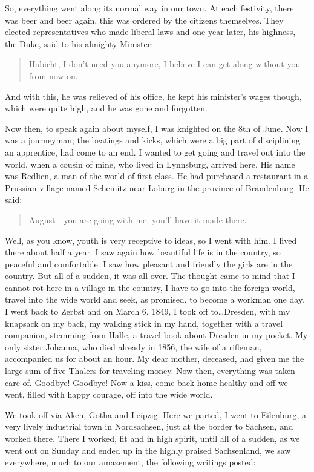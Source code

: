\documentclass{article}
\begin{document}
So, everything went along its normal way in our town. At each festivity, there was beer and beer again, this was ordered by the citizens themselves. They elected representatives who made liberal laws and one year later, his highness, the Duke, said to his almighty Minister:

\begin{quote}
Habicht, I don't need you anymore, I believe I can get along without you from now on.
\end{quote}

And with this, he was relieved of his office, he kept his minister's wages though, which were quite high, and he was gone and forgotten.

Now then, to speak again about myself, I was knighted on the 8th of June. Now I was a journeyman; the beatings and kicks, which were a big part of disciplining an apprentice, had come to an end. I wanted to get going and travel out into the world, when a cousin of mine, who lived in Lynnsburg, arrived here. His name was Redlicn, a man of the world of first class. He had purchased a restaurant in a Prussian village named Scheinitz near Loburg in the province of Brandenburg. He said:

\begin{quote}
August - you are going with me, you'll have it made there.
\end{quote}

Well, as you know, youth is very receptive to ideas, so I went with him. I lived there about half a year. I saw again how beautiful life is in the country, so peaceful and comfortable. I saw how pleasant and friendly the girls are in the country. But all of a sudden, it was all over. The thought came to mind that I cannot rot here in a village in the country, I have to go into the foreign world, travel into the wide world and seek, as promised, to become a workman one day. I went back to Zerbst and on March 6, 1849, I took off to\ldots Dresden, with my knapsack on my back, my walking stick in my hand, together with a travel companion, stemming from Halle, a travel book about Dresden in my pocket. My only sister Johanna, who died already in 1856, the wife of a rifleman, accompanied us for about an hour. My dear mother, deceased, had given me the large sum of five Thalers for traveling money. Now then, everything was taken care of. Goodbye! Goodbye! Now a kiss, come back home healthy and off we went, filled with happy courage, off into the wide world.

We took off via Aken, Gotha and Leipzig. Here we parted, I went to Eilenburg, a very lively industrial town in Nordsachsen, just at the border to Sachsen, and worked there. There I worked, fit and in high spirit, until all of a sudden, as we went out on Sunday and ended up in the highly praised Sachsenland, we saw everywhere, much to our amazement, the following writings posted:
\end{document}
